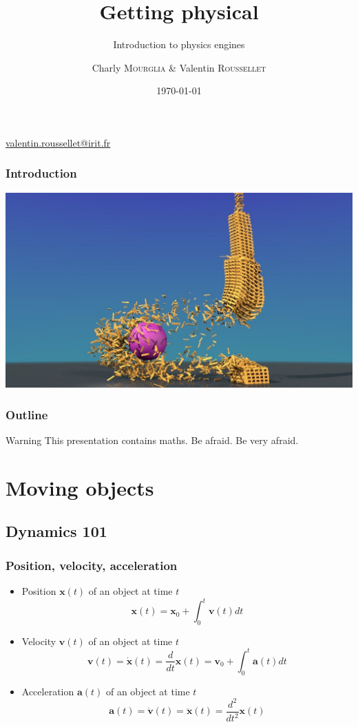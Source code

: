\documentclass{beamer}
\title{Getting physical}
\subtitle{Introduction to physics engines}
\author{Charly \textsc{Mourglia} \& Valentin \textsc{Roussellet}}
\institute[IRIT]{IRIT}
\date{\today}
\begin{document}
\begin{frame}
  \titlepage
\begin{center}
\href{mailto:valentin.roussellet@irit.fr}{valentin.roussellet@irit.fr}
\end{center}
\end{frame}


\begin{frame}
 \frametitle{Introduction}
 \includegraphics[width=1.04\textwidth]{bullet.jpg}
\end{frame}

\begin{frame}
 \frametitle{Outline}
 \tableofcontents
 \begin{alertblock}{Warning}
  This presentation contains maths. Be afraid. Be very afraid.
 \end{alertblock}

\end{frame}



\section{Moving objects}
\subsection{Dynamics 101}
\begin{frame}
  \frametitle{Position, velocity, acceleration}
  \begin{itemize}
  \item Position $\mathbf{x}(t)$ of an object at time $t$
    $$
    \mathbf{x}(t) = \mathbf{x}_0 + \int_0^t \mathbf{v}(t)dt
    $$
    
    \pause
  \item Velocity $\mathbf{v}(t)$ of an object at time $t$
    $$
    \mathbf{v}(t) = \dot{\mathbf{x}}(t) = \frac{d}{dt}\mathbf{x}(t) = \mathbf{v}_0 + \int_0^t \mathbf{a}(t)dt
    $$

    \pause
  \item Acceleration $\mathbf{a}(t)$ of an object at time $t$
    $$
    \mathbf{a}(t) = \dot{\mathbf{v}}(t) = \ddot{\mathbf{x}}(t) = \frac{d^2}{dt^2}\mathbf{x}(t)
    $$
  \end{itemize}
\end{frame}
\end{document}
